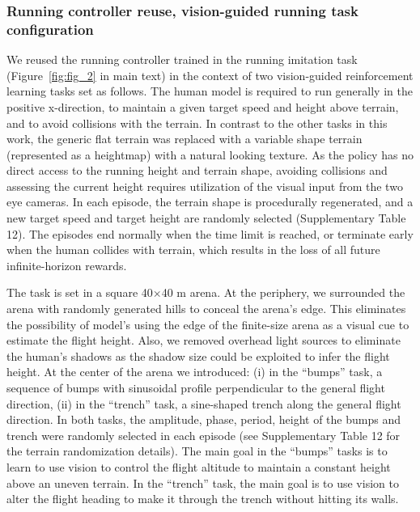 \documentclass[sn-mathphys-num]{sn-jnl}%
\theoremstyle{thmstyleone}%
\theoremstyle{thmstyletwo}%
\theoremstyle{thmstylethree}%
\begin{document}
\begin{appendices}
\subsubsection{Running controller reuse, vision-guided running task configuration}

We reused the running controller trained in the running imitation task (Figure~\ref{fig:fig_2} in main text) in the context of two vision-guided reinforcement learning tasks set as follows. 
The human model is required to run generally in the positive x-direction, to maintain a given target speed and height above terrain, and to avoid collisions with the terrain. 
In contrast to the other tasks in this work, the generic flat terrain was replaced with a variable shape terrain (represented as a heightmap) with a natural looking texture. 
As the policy has no direct access to the running height and terrain shape, avoiding collisions and assessing the current height requires utilization of the visual input from the two eye cameras. 
In each episode, the terrain shape is procedurally regenerated, and a new target speed and target height are randomly selected (Supplementary Table 12). 
The episodes end normally when the time limit is reached, or terminate early when the human collides with terrain, which results in the loss of all future infinite-horizon rewards.


The task is set in a square 40$ \times $40 m arena. 
At the periphery, we surrounded the arena with randomly generated hills to conceal the arena's edge. 
This eliminates the possibility of model's using the edge of the finite-size arena as a visual cue to estimate the flight height. 
Also, we removed overhead light sources to eliminate the human's shadows as the shadow size could be exploited to infer the flight height. 
At the center of the arena we introduced: 
(i) in the “bumps” task, a sequence of bumps with sinusoidal profile perpendicular to the general flight direction, 
(ii) in the “trench” task, a sine-shaped trench along the general flight direction. 
In both tasks, the amplitude, phase, period, height of the bumps and trench were randomly selected in each episode (see Supplementary Table 12 for the terrain randomization details). 
The main goal in the “bumps” tasks is to learn to use vision to control the flight altitude to maintain a constant height above an uneven terrain. 
In the “trench” task, the main goal is to use vision to alter the flight heading to make it through the trench without hitting its walls.



\end{appendices}
\end{document}
